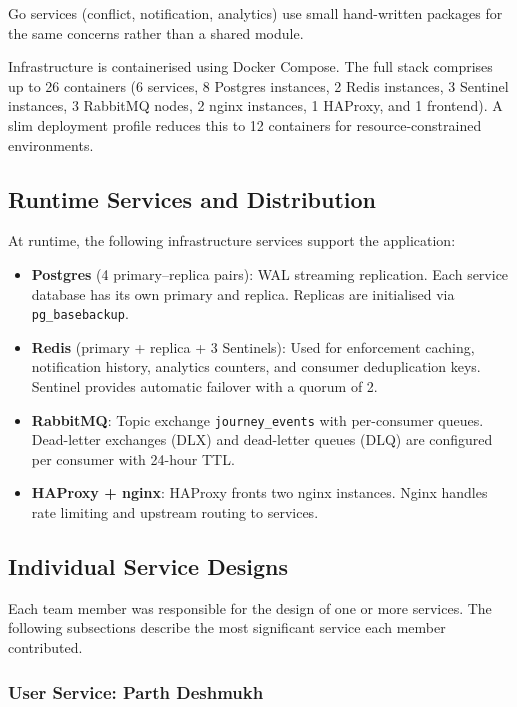 \documentclass[12pt,a4paper]{article}
\begin{document}
Go services (conflict, notification, analytics) use small hand-written packages for the same concerns rather than a shared module.
 
Infrastructure is containerised using Docker Compose. The full stack comprises up to 26 containers (6 services, 8 Postgres instances, 2 Redis instances, 3 Sentinel instances, 3 RabbitMQ nodes, 2 nginx instances, 1 HAProxy, and 1 frontend). A slim deployment profile reduces this to 12 containers for resource-constrained environments.
 
\subsection{Runtime Services and Distribution}
 
At runtime, the following infrastructure services support the application:
 
\begin{itemize}
    \item \textbf{Postgres} (4 primary--replica pairs): WAL streaming replication. Each service database has its own primary and replica. Replicas are initialised via \texttt{pg\_basebackup}.
    \item \textbf{Redis} (primary + replica + 3 Sentinels): Used for enforcement caching, notification history, analytics counters, and consumer deduplication keys. Sentinel provides automatic failover with a quorum of 2.
    \item \textbf{RabbitMQ}: Topic exchange \texttt{journey\_events} with per-consumer queues. Dead-letter exchanges (DLX) and dead-letter queues (DLQ) are configured per consumer with 24-hour TTL.
    \item \textbf{HAProxy + nginx}: HAProxy fronts two nginx instances. Nginx handles rate limiting and upstream routing to services.
\end{itemize}
 
\subsection{Individual Service Designs}
 
Each team member was responsible for the design of one or more services. The following subsections describe the most significant service each member contributed.
 
\subsubsection{User Service: Parth Deshmukh}
 
\end{document}
